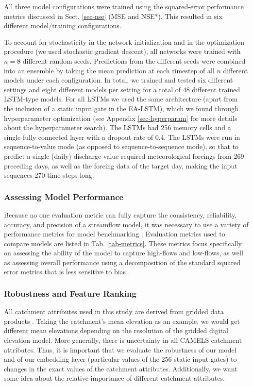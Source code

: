 All three model configurations were trained using the squared-error performance metrics discussed in Sect. \ref{sec-nse} (\gls{MSE} and \gls{NSE*}). This resulted in six different model/training configurations. 

To account for stochasticity in the network initialization and in the optimization procedure (we used stochastic gradient descent), all networks were trained with $n=8$ different random seeds. Predictions from the different seeds were combined into an ensemble by taking the mean prediction at each timestep of all $n$ different models under each configuration. In total, we trained and tested six different settings and eight different models per setting for a total of 48 different trained LSTM-type models. For all \glspl{LSTM} we used the same architecture (apart from the inclusion of a static input gate in the \gls{EA-LSTM}), which we found through hyperparameter optimization (see Appendix \ref{sec-hyperparam} for more details about the hyperparameter search). The \glspl{LSTM} had 256 memory cells and a single fully connected layer with a dropout rate \citep{srivastava2014dropout} of 0.4. The \glspl{LSTM} were run in sequence-to-value mode (as opposed to sequence-to-sequence mode), so that to predict a  single (daily) discharge value required meteorological forcings from 269 preceding days, as well as the forcing data of the target day, making the input sequences 270 time steps long. 

\subsubsection{Assessing Model Performance}\label{sec-model-perf}

Because no one evaluation metric can fully capture the consistency, reliability, accuracy, and precision of a streamflow model, it was necessary to use a variety of performance metrics for model benchmarking \citep{gupta1998toward}. Evaluation metrics used to compare models are listed in Tab. \ref{tab-metrics}. These metrics focus specifically on assessing the ability of the model to capture high-flows and low-flows, as well as assessing overall performance using a decomposition of the standard squared error metrics that is less sensitive to bias \citep{gupta2009decomposition}.

\subsubsection{Robustness and Feature Ranking}\label{sec-morris}
All catchment attributes used in this study are derived from gridded data products \citep{addor2017camels}. Taking the catchment’s mean elevation as an example, we would get different mean elevations depending on the resolution of the gridded digital elevation model. More generally, there is uncertainty in all \gls{CAMELS} catchment attributes. Thus, it is important that we evaluate the robustness of our model and of our embedding layer (particular values of the 256 static input gates) to changes in the exact values of the catchment attributes. Additionally, we want some idea about the relative importance of different catchment attributes. 


